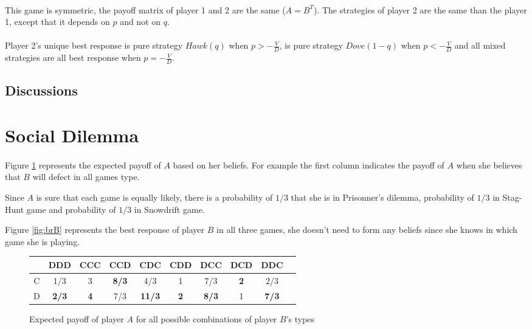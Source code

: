 \documentclass[letterpaper]{article}
\begin{document}
\paragraph{}

This game is symmetric, the payoff matrix of player 1 and 2 are the same
($A = B^T$). The strategies of player 2 are the same than the player 1, except
that it depends on $p$ and not on $q$.
\paragraph{}

Player 2's unique best response is pure strategy $Hawk(q)$
when $p > -\frac{V}{D}$,  is pure strategy $Dove(1 - q)$ when
$p < -\frac{V}{D}$ and all mixed strategies are all best response when
$p = -\frac{V}{D}$.

\subsection{Discussions}



\section{Social Dilemma}


\paragraph{}

Figure \ref{fig:brA} represents the expected payoff of $A$ based on her
beliefs. For example the first column indicates the payoff of $A$ when she
believes that $B$ will defect in all games type.

Since $A$ is sure that each game is equally likely, there is a probability of
$1/3$ that she is in Prisonner's dilemma,
probability of $1/3$ in Stag-Hunt game and probability of $1/3$ in Snowdrift
game.

Figure \ref{fig:brB} represents the best response of player $B$ in all three
games, she doesn't need to form any beliefs since she knows in which game
she is playing.

\begin{figure}[!ht]

\begin{center}
\begin{tabular}{|c|c|c|c|c|c|c|c|c|c|}
    \hline
    & DDD & CCC & CCD & CDC & CDD & DCC & DCD & DDC \\
    \hline
    C & 1/3 & 3 & \textbf{8/3} & 4/3 & 1 & 7/3 & \textbf{\color{red}2} & 2/3 \\
    \hline
    D & \textbf{2/3} & \textbf{4} & 7/3 & \textbf{11/3}
    & \textbf{2} & \textbf{8/3} & 1 & \textbf{\color{red}7/3} \\
    \hline
\end{tabular}
\end{center}

\caption{Expected payoff of player $A$ for all possible combinations of
player $B$’s types}
\label{fig:brA}
\end{figure}
\end{document}
